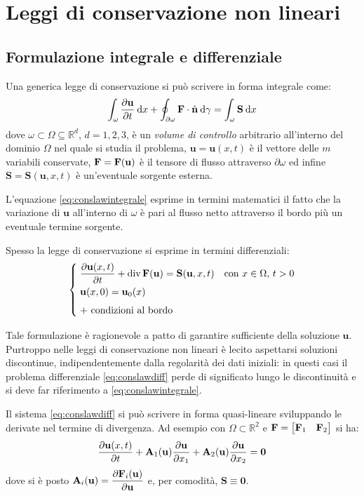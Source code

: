 \section{Leggi di conservazione non lineari}
\subsection{Formulazione integrale e differenziale}
Una generica legge di conservazione si può scrivere in forma integrale come:
\begin{equation} \label{eq:conslawintegrale}
\int_\omega \dfrac{\partial \mathbf u}{\partial t} \: \mathrm{d}x + \oint_{\partial \omega} \mathbf{F} \cdot \hat{\mathbf{n}} \: \mathrm{d}\gamma
= \int_\omega \mathbf S \: \mathrm{d}x
\end{equation}
dove $\omega \subset \Omega \subseteq \mathbb{R}^d$, $d=1,2,3$, è un \emph{volume di controllo} arbitrario all'interno del dominio $\Omega$ nel quale si studia il problema, $\mathbf u = \mathbf{u}(x,t)$ è il vettore delle $m$ variabili conservate, $\mathbf{F} = \mathbf{F}(\mathbf u)$ è il tensore di flusso attraverso $\partial \omega$ ed infine $\mathbf S = \mathbf S(\mathbf u, x, t)$ è un'eventuale sorgente esterna.

L'equazione \eqref{eq:conslawintegrale} esprime in termini matematici il fatto che la variazione di $\mathbf u$ all'interno di $\omega$ è pari al flusso netto attraverso il bordo più un eventuale termine sorgente.
 
Spesso la legge di conservazione si esprime in termini differenziali:
\begin{equation} \label{eq:conslawdiff}
\begin{cases}
\; \dfrac{\partial \mathbf u(x,t)}{\partial t} + \operatorname{div} \mathbf{F}(\mathbf u) = \mathbf S(\mathbf u,x,t) & \text{con $x \in \Omega$, $t > 0$} \\[1ex]
\; \mathbf{u}(x,0) = \mathbf u_0(x) \\[1ex]
\; \text{+ condizioni al bordo}
\end{cases}
\end{equation}

Tale formulazione è ragionevole a patto di garantire sufficiente della soluzione $\mathbf u$. Purtroppo nelle leggi di conservazione non lineari è lecito aspettarsi soluzioni discontinue, indipendentemente dalla regolarità dei dati iniziali: in questi casi il problema differenziale \eqref{eq:conslawdiff} perde di significato lungo le discontinuità e si deve far riferimento a \eqref{eq:conslawintegrale}.
 
Il sistema \eqref{eq:conslawdiff} si può scrivere in forma quasi-lineare sviluppando le derivate nel termine di divergenza. Ad esempio con $\Omega \subset \mathbb{R}^2$ e $\mathbf{F} = \begin{bmatrix} \mathbf{F}_1 & \mathbf{F}_2 \end{bmatrix}$ si ha:
\begin{equation}\label{eq:conslawquasilin}
\dfrac{\partial \mathbf u(x,t)}{\partial t} + \mathbf{A}_1(\mathbf{u}) \dfrac{\partial \mathbf u}{\partial x_1} + \mathbf{A}_2(\mathbf{u}) \dfrac{\partial \mathbf u}{\partial x_2} 
= \mathbf 0
\end{equation}
dove si è posto $\mathbf{A}_i(\mathbf{u}) = \dfrac{\partial \mathbf{F}_i(\mathbf{u})}{\partial \mathbf u}$ e, per comodità, $\mathbf S \equiv \mathbf 0$.

